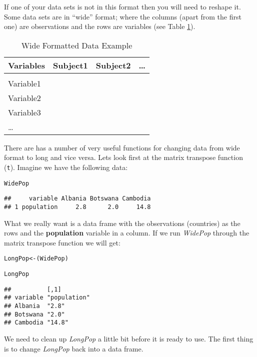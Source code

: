 \noindent If one of your data sets is not in this format then you will need to reshape it. Some data sets are in ``wide'' format; where the columns (apart from the first one) are observations and the rows are variables (see Table \ref{ExampleWide}).

\begin{table}[h!]
	\caption{Wide Formatted Data Example}
	\label{ExampleWide}
	\begin{tabular}{l c c c}
		\hline 
		Variables & Subject1 & Subject2 & \ldots \\
		\hline \\[0.1cm]
		Variable1 & & & \\[0.25cm]
		Variable2 & & & \\[0.25cm]
		Variable3 & & & \\[0.25cm]
		\ldots & & & \\[0.25cm]
		\hline
	\end{tabular}
\end{table}

There are  has a number of very useful functions for changing data from wide format to long and vice versa. Lets look first at the matrix transpose function (\texttt{t}). Imagine we have the following data:




\begin{knitrout}
\color{fgcolor}\begin{kframe}
\begin{alltt}
WidePop
\end{alltt}
\begin{verbatim}
##     variable Albania Botswana Cambodia
## 1 population     2.8      2.0     14.8
\end{verbatim}
\end{kframe}
\end{knitrout}


\noindent What we really want is a data frame with the observations (countries) as the rows and the \textbf{population} variable in a column. If we run \emph{WidePop} through the matrix transpose function we will get:

\begin{knitrout}
\color{fgcolor}\begin{kframe}
\begin{alltt}
LongPop <- (WidePop)

LongPop
\end{alltt}
\begin{verbatim}
##          [,1]        
## variable "population"
## Albania  "2.8"       
## Botswana "2.0"       
## Cambodia "14.8"
\end{verbatim}
\end{kframe}
\end{knitrout}


\noindent We need to clean up \emph{LongPop} a little bit before it is ready to use. The first thing is to change \emph{LongPop} back into a data frame.


